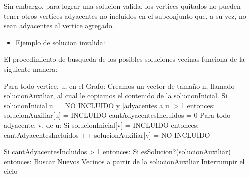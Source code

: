 Sin embargo, para lograr una solucion valida, los vertices quitados no pueden tener otros vertices adyacentes no incluidos en el subconjunto que, a su vez, no sean adyacentes al vertice agregado.

\begin{itemize}
	\item Ejemplo de solucion invalida:
    

\end{itemize}

El procedimiento de busqueda de los posibles soluciones vecinas funciona de la siguiente manera:

\begin{codesnippet}
Para todo vertice, u, en el Grafo:
  Creamos un vector de tamaño n, llamado solucionAuxiliar, al cual le copiamos 
  el contenido de la solucionInicial.
  Si solucionInicial[u] = NO INCLUIDO y |adyacentes a u| > 1 entonces:
     solucionAuxiliar[u] = INCLUIDO
     cantAdyacentesIncluidos = 0
     Para todo adyacente, v, de u:
         Si solucionInicial[v] = INCLUIDO entonces:
             cantAdyacentesIncluidos ++
             solucionAuxiliar[v] = NO INCLUIDO
  
  Si cantAdyacentesIncluidos > 1 entonces:
     Si esSolucion?(solucionAuxiliar) entonces:
       Buscar Nuevos Vecinos a partir de la solucionAuxiliar
       Interrumpir el ciclo
     
\end{codesnippet}

